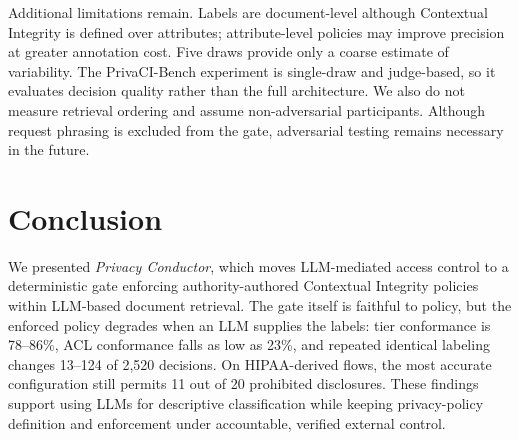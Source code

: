 Additional limitations remain. Labels are document-level although Contextual Integrity is defined over attributes; attribute-level policies may improve precision at greater annotation cost. Five draws provide only a coarse estimate of variability. The PrivaCI-Bench experiment is single-draw and judge-based, so it evaluates decision quality rather than the full architecture. We also do not measure retrieval ordering and assume non-adversarial participants. Although request phrasing is excluded from the gate, adversarial testing remains necessary in the future.

\section{Conclusion}
\label{sec:conclusion}

We presented \emph{Privacy Conductor}, which moves LLM-mediated access control to a deterministic gate enforcing authority-authored Contextual Integrity policies within LLM-based document retrieval. The gate itself is faithful to policy, but the enforced policy degrades when an LLM supplies the labels: tier conformance is 78--86\%, ACL conformance falls as low as 23\%, and repeated identical labeling changes 13--124 of 2,520 decisions. On HIPAA-derived flows, the most accurate configuration still permits 11 out of 20 prohibited disclosures. These findings support using LLMs for descriptive classification while keeping privacy-policy definition and enforcement under accountable, verified external control.

